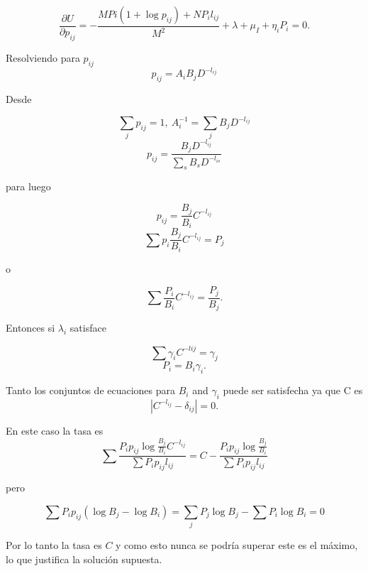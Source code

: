 \begin{appendices}
\begin{equation}
\frac {\partial U}{\partial p_{ij}}=-\frac{MP{i}(1+\log p_{ij})+NP_{i}l_{ij}}{M^{2}}+\lambda+\mu_{I}+\eta _{i}P_{i}=0.
\end{equation}

Resolviendo para $p_{ij}$
\begin{equation}
p_{ij}=A_{i}B_{j}D^{-l_{ij}}
\end{equation}

Desde

\begin{equation}
\sum _{j}p_{ij}=1,\ A_{i}^{-1}=\sum_{j}B_{j}D^{-l_{ij}}
\end{equation}
\begin{equation}
p_{ij}=\frac{B_{j}D^{-l_{ij}}}{\sum_{s}B_{s}D^{-l_{is}}}
\end{equation}

para luego

\begin{equation}
p_{ij}=\frac{B_{j}}{B_{i}}C^{-l_{ij}}
\end{equation}
\begin{equation}
\sum p_{i}\frac{B_{j}}{B_{i}}C^{-l_{ij}}=P_{j}
\end{equation}

o

\begin{equation}
\sum \frac{P_{i}}{B_{i}}C^{-l_{ij}}=\frac {P_{j}}{B_{j}}.
\end{equation}

Entonces si $\lambda_{i}$ satisface

\begin{equation}
\sum\gamma _{i}C^{-lij}=\gamma_{j}
\end{equation}
\begin{equation}
P_{i}=B_{i}\gamma _{i}.
\end{equation}

Tanto los conjuntos de ecuaciones para $B_{i}$ and $\gamma_{i}$ puede ser satisfecha ya 
que C es
\begin{equation}
\left | C^{-l_{ij}} - \delta _{ij}\right |=0.
\end{equation}

En este caso la tasa es
\begin{equation}
\sum \frac{P_{i}p_{ij}\log \frac{B_{j}}{B_{i}}C^{-l_{ij}}}{\sum P_{i}p_{ij}l_{ij}}=C-\frac{P_{i}p_{ij}\log \frac{B_{j}}{B_{i}}}{\sum P_{i}p_{ij}l_{ij}}
\end{equation}

pero

\begin{equation}
\sum P_{i}p_{ij}(\log B_{j}-\log B_{i})=\sum_{j}P_{j}\log B_{j}-\sum P_{i}\log B_{i}=0
\end{equation}

Por lo tanto la tasa es $C$ y como esto nunca se podr\'ia superar este es el 
m\'aximo, lo que justifica la soluci\'on supuesta.

\end{appendices}
